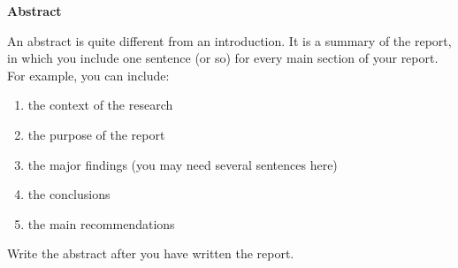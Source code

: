 \newpage
{}
\thispagestyle{plain}
\begin{center}
    \large
    \textbf{Abstract}
\end{center}

An abstract is quite different from an introduction. It is a summary of the report, in which you include one sentence (or so) for every main section of your report. For example, you can include:
\begin{enumerate}
\item
the context of the research
\item
the purpose of the report
\item
the major findings (you may need several sentences here)
\item
the conclusions
\item
the main recommendations
\end{enumerate}
Write the abstract after you have written the report.